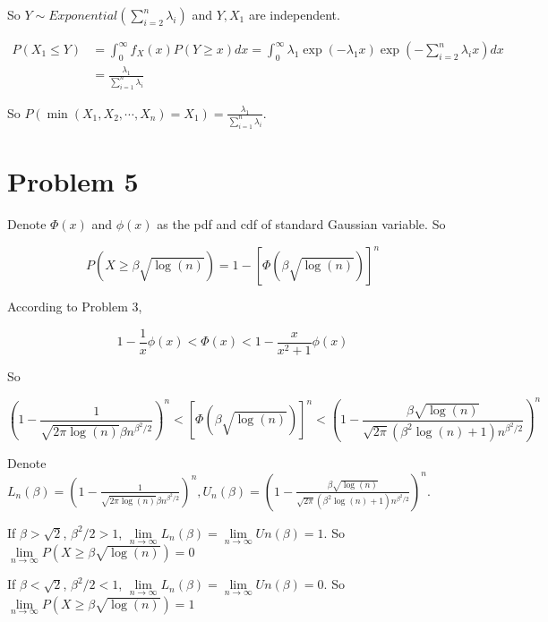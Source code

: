 \documentclass{article}
\begin{document}
So $Y\sim Exponential(\sum_{i=2}^n\lambda_i)$ and $Y,X_1$ are independent.

\begin{equation}
    \begin{aligned}
        P(X_1\leqslant Y) & = \int_{0}^{\infty}f_X(x) P(Y\geqslant x) dx =  \int_{0}^{\infty}\lambda_1 \exp(-\lambda_1 x) \exp(-\sum_{i=2}^n\lambda_i x)  dx \\
        & = \frac{\lambda_1}{ \sum_{i=1}^n\lambda_i}
    \end{aligned}
\end{equation}

So $P(\min(X_1,X_2,\cdots,X_n)= X_1) = \frac{\lambda_1}{ \sum_{i=1}^n\lambda_i}$.

\section{Problem 5}


Denote $\Phi(x)$ and $\phi(x)$ as the pdf and cdf of standard Gaussian variable. So 

\begin{equation}
    P(X\geq \beta \sqrt{\log(n)}) = 1- [\Phi(\beta \sqrt{\log(n)})]^n
\end{equation}

According to Problem 3, 

\begin{equation}
    1- \frac{1}{x}\phi(x)<\Phi(x) < 1- \frac{x}{x^2+1} \phi(x)
\end{equation}

So 


\begin{equation}
    \left(1-\frac{1}{\sqrt{2\pi \log(n)} \beta n^{\beta^2/2}}\right)^n < [\Phi(\beta \sqrt{\log(n)})]^n < \left(1-\frac{\beta \sqrt{\log (n)}}{\sqrt{2\pi} (\beta^2\log(n)+1) n^{\beta^2/2}}\right)^n
\end{equation}

Denote $L_n(\beta) = \left(1-\frac{1}{\sqrt{2\pi \log(n)} \beta n^{\beta^2/2}}\right)^n,U_n(\beta) = \left(1-\frac{\beta \sqrt{\log (n)}}{\sqrt{2\pi} (\beta^2\log(n)+1) n^{\beta^2/2}}\right)^n$.

If $\beta >\sqrt{2}$, $\beta^2/2 >1$,  $\lim\limits_{n\to\infty} L_n(\beta) = \lim\limits_{n\to\infty} Un(\beta) = 1$.  So $\lim\limits_{n\to\infty} P(X\geq \beta \sqrt{\log(n)}) = 0$

If $\beta <\sqrt{2}$, $\beta^2/2 <1$,  $\lim\limits_{n\to\infty} L_n(\beta) = \lim\limits_{n\to\infty} Un(\beta) = 0$.  So $\lim\limits_{n\to\infty} P(X\geq \beta \sqrt{\log(n)}) = 1$
\end{document}
